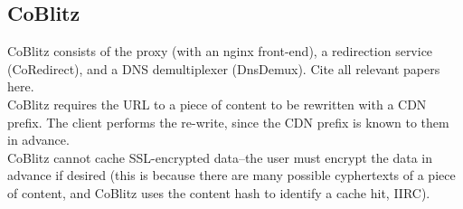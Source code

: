 {\subsection{CoBlitz}
CoBlitz consists of the proxy (with an nginx front-end), a redirection service (CoRedirect), and a DNS demultiplexer (DnsDemux).  Cite all relevant papers here.
\\
CoBlitz requires the URL to a piece of content to be rewritten with a CDN prefix.  The client performs the re-write, since the CDN prefix is known to them in advance.
\\
CoBlitz cannot cache SSL-encrypted data--the user must encrypt the data in advance if desired (this is because there are many possible cyphertexts of a piece of content, and CoBlitz uses the content hash to identify a cache hit, IIRC).
}
